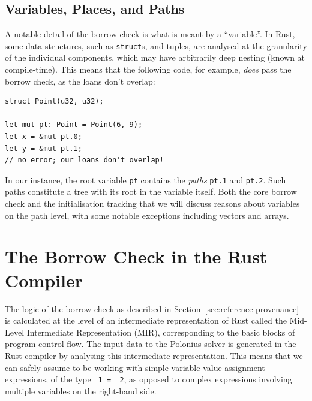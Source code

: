\documentclass[11pt,a4paper,twoside,openany]{report}
\newcommand{\fixme}[1] {{\color{red}#1}}
\newcommand{\InRust}[1]{\texttt{#1}}
\begin{document}
\subsection{Variables, Places, and Paths}
\label{sec:vars-places-paths}

A notable detail of the borrow check is what is meant by a ``variable''. In
Rust, some data structures, such as \InRust{struct}s, and tuples, are analysed
at the granularity of the individual components, which may have arbitrarily deep
nesting (known at compile-time). This means that the following code, for
example, \emph{does} pass the borrow check, as the loans don't overlap:
\begin{verbatim}
struct Point(u32, u32);

let mut pt: Point = Point(6, 9);
let x = &mut pt.0;
let y = &mut pt.1;
// no error; our loans don't overlap!
\end{verbatim}

In our instance, the root variable \InRust{pt} contains the \emph{paths}
\InRust{pt.1} and \InRust{pt.2}. Such paths constitute a tree with its root in
the variable itself. Both the core borrow check and the initialisation tracking
that we will discuss reasons about variables on the path level, with some
notable exceptions including vectors and arrays.

\section{The Borrow Check in the Rust Compiler}
\label{sec:rust-specificts}

The logic of the borrow check as described in
Section~\ref{sec:reference-provenance} is calculated at the level of an
intermediate representation of Rust called the Mid-Level Intermediate
Representation (MIR), corresponding to the basic blocks of program control flow.
The input data to the Polonius solver is generated in the Rust compiler by
analysing this intermediate representation. This means that we can safely assume
to be working with simple variable-value assignment expressions, of the type
\InRust{_1 = _2}, as opposed to complex expressions involving multiple variables
on the right-hand side.

\end{document}

